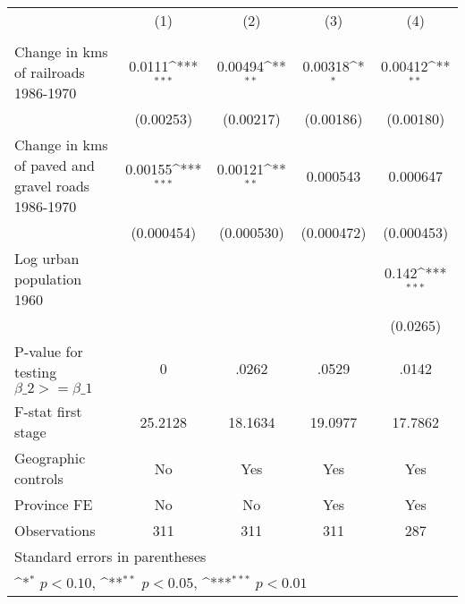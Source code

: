{
\def\sym#1{\ifmmode^{#1}\else\(^{#1}\)\fi}
\begin{tabular}{l*{4}{c}}
\hline\hline
                &\multicolumn{1}{c}{(1)}&\multicolumn{1}{c}{(2)}&\multicolumn{1}{c}{(3)}&\multicolumn{1}{c}{(4)}\\
                &\multicolumn{1}{c}{}&\multicolumn{1}{c}{}&\multicolumn{1}{c}{}&\multicolumn{1}{c}{}\\
\hline
Change in kms of railroads 1986-1970&   0.0111\sym{***}&  0.00494\sym{**} &  0.00318\sym{*}  &  0.00412\sym{**} \\
                &(0.00253)         &(0.00217)         &(0.00186)         &(0.00180)         \\
[1em]
Change in kms of paved and gravel roads 1986-1970&  0.00155\sym{***}&  0.00121\sym{**} & 0.000543         & 0.000647         \\
                &(0.000454)         &(0.000530)         &(0.000472)         &(0.000453)         \\
[1em]
Log urban population 1960&                  &                  &                  &    0.142\sym{***}\\
                &                  &                  &                  & (0.0265)         \\
\hline
P-value for testing $\beta\_{2} >= \beta\_{1}$&        0         &    .0262         &    .0529         &    .0142         \\
F-stat first stage&  25.2128         &  18.1634         &  19.0977         &  17.7862         \\
Geographic controls&       No         &      Yes         &      Yes         &      Yes         \\
Province FE     &       No         &       No         &      Yes         &      Yes         \\
Observations    &      311         &      311         &      311         &      287         \\
\hline\hline
\multicolumn{5}{l}{\footnotesize Standard errors in parentheses}\\
\multicolumn{5}{l}{\footnotesize \sym{*} \(p<0.10\), \sym{**} \(p<0.05\), \sym{***} \(p<0.01\)}\\
\end{tabular}
}
